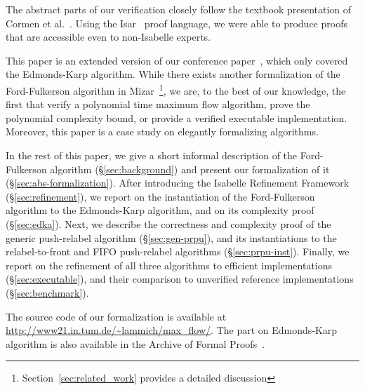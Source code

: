 \documentclass[smallcondensed]{svjour3}     %
\begin{document}
The abstract parts of our verification closely follow the textbook presentation of Cormen et al.~\cite{CLRS09}. 
Using the Isar~\cite{Wenzel99} proof language, we were able to produce proofs that are accessible even to non-Isabelle experts.

This paper is an extended version of our conference paper~\cite{LaSe16}, which only covered the Edmonds-Karp algorithm.
While there exists another formalization of the Ford-Fulkerson algorithm in Mizar~\cite{Lee05}\footnote{Section~\ref{sec:related_work} provides a detailed discussion}, we are, to the best of our knowledge, the first that verify a polynomial time maximum flow algorithm, prove the polynomial complexity bound, or provide a verified executable implementation. Moreover, this paper is a case study on elegantly formalizing algorithms.

In the rest of this paper, we give a short informal description of the Ford-Fulkerson algorithm (\S\ref{sec:background})
and present our formalization of it (\S\ref{sec:abs-formalization}). After introducing the Isabelle Refinement Framework~\cite{LaTu12,La12} (\S\ref{sec:refinement}), we report on the instantiation of the Ford-Fulkerson algorithm to the Edmonds-Karp algorithm, and on its complexity proof (\S\ref{sec:edka}).
Next, we describe the correctness and complexity proof of the generic push-relabel algorithm (\S\ref{sec:gen-prpu}), and its instantiations 
to the relabel-to-front and FIFO push-relabel algorithms (\S\ref{sec:prpu-inst}).
Finally, we report on the refinement of all three algorithms to efficient implementations (\S\ref{sec:executable}), and their comparison to unverified reference 
implementations (\S\ref{sec:benchmark}).

The source code of our formalization is available at \url{http://www21.in.tum.de/~lammich/max_flow/}. 
The part on Edmonds-Karp algorithm is also available in the Archive of Formal Proofs~\cite{LaSe16_afp}.


\end{document}
